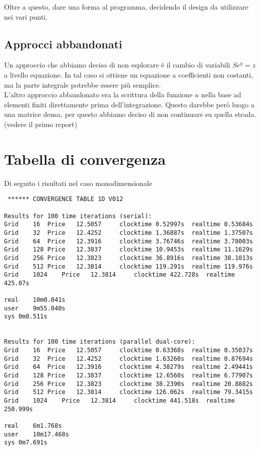 \documentclass[a4paper,10pt]{article}
\begin{document}
Oltre a questo, dare una forma al programma, decidendo il design da utilizzare nei vari punti. 

\subsection{Approcci abbandonati}
Un approccio che abbiamo deciso di non esplorare è il cambio di variabili $Se^y=z$ a livello equazione. In tal caso si ottiene un equazione a coefficienti non costanti, ma la parte integrale potrebbe essere più semplice.\\
L'altro approccio abbandonato era la scrittura della funzione $u$ nella base ad elementi finiti direttamente prima dell'integrazione. Questo darebbe però luogo a una matrice densa, per questo abbiamo deciso di non continuare su quella strada. (vedere il primo report)


\clearpage
\appendix
\section{Tabella di convergenza}
\label{app:conver}
Di seguito i risultati nel caso monodimensionale
\begin{verbatim}
 ****** CONVERGENCE TABLE 1D V012

Results for 100 time iterations (serial):
Grid	16	Price	12.5057		clocktime 0.52997s	realtime 0.53684s
Grid	32	Price	12.4252		clocktime 1.36887s	realtime 1.37507s
Grid	64	Price	12.3916		clocktime 3.76746s	realtime 3.78003s
Grid	128	Price	12.3837		clocktime 10.9453s	realtime 11.1629s
Grid	256	Price	12.3823		clocktime 36.8916s	realtime 38.1013s
Grid	512	Price	12.3814		clocktime 119.291s	realtime 119.976s
Grid	1024	Price	12.3814		clocktime 422.728s	realtime 425.07s

real	10m0.041s
user	9m55.040s
sys	0m0.511s


Results for 100 time iterations (parallel dual-core):
Grid	16	Price	12.5057		clocktime 0.63368s	realtime 0.35037s
Grid	32	Price	12.4252		clocktime 1.63260s	realtime 0.87694s
Grid	64	Price	12.3916		clocktime 4.38279s	realtime 2.49441s
Grid	128	Price	12.3837		clocktime 12.6560s	realtime 6.77907s
Grid	256	Price	12.3823		clocktime 38.2390s	realtime 20.8882s
Grid	512	Price	12.3814		clocktime 126.062s	realtime 79.3415s
Grid	1024	Price	12.3814		clocktime 441.518s	realtime 250.999s

real	6m1.768s
user	10m17.468s
sys	0m7.691s

\end{verbatim}
\end{document}
